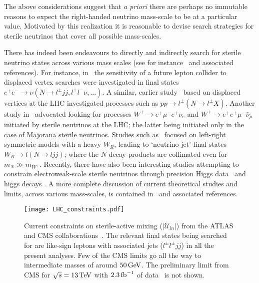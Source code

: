 \documentclass[reprint,doublecolumn,secnumarabic,amssymb, amsmath, aps,nofootinbib,superscriptaddress]{revtex4-1}
\begin{document}
The above considerations suggest that \textit{a priori} there are perhaps no immutable reasons to expect the right-handed neutrino mass-scale to be at a particular value. Motivated by this realization it is reasonable to devise search strategies for sterile neutrinos that cover all possible mass-scales. 

There has indeed been endeavours to directly and indirectly search for sterile neutrino states across various mass scales (see for instance~\cite{Keung:1983uu, Pilaftsis:1991ug, Datta:1993nm, delAguila:2006bda,Atre:2009rg, Deppisch:2015qwa,Dev:2016gvv, Antusch:2016ejd,Lindner:2016lxq,Campos:2017odj,Abada:2012mc, Abada:2013aba,Abada:2014kba} and associated references). For instance, in~\cite{Antusch:2016vyf} the sensitivity of a future lepton collider to displaced vertex searches were investigated in final states $e^+ e^- \rightarrow \nu (N \rightarrow l^\pm jj, l^+ l^- \nu,\ldots)$. A similar, earlier study~\cite{Helo:2013esa} based on displaced vertices at the LHC investigated processes such as $pp\rightarrow l^\pm (N \rightarrow l^\pm X)$. Another study in~\cite{Dib:2015oka} advocated looking for processes $W^+ \rightarrow e^+ \mu^- e^+ \nu_e$ and $W^+ \rightarrow e^+ e^+ \mu^- \bar{\nu}_\mu$ initiated by sterile neutrinos at the LHC; the latter being initiated only in the case of Majorana sterile neutrinos. Studies such as~\cite{Mitra:2016kov} focused on left-right symmetric models with a heavy $W_R$, leading to `neutrino-jet' final states $W_R\rightarrow l (N\rightarrow l jj)$; where the $N$ decay-products are collimated even for $m_N\gg m_{W^\pm}$. Recently, there have also been interesting studies attempting to constrain electroweak-scale sterile neutrinos through precision Higgs data~\cite{Das:2017zjc} and higgs decays \cite{Das:2017rsu}. A more complete discussion of current theoretical studies and limits, across various mass-scales, is contained in~\cite{delAguila:2006bda,Atre:2009rg, Deppisch:2015qwa,Dev:2016gvv, Antusch:2016ejd} and associated references. 

\begin{figure}
  \centering
   \texttt{[image: LHC\_constraints.pdf]}
  \caption{Current constraints on sterile-active mixing ($|\mathcal{U}_{ln}|$) from the ATLAS and CMS collaborations~\cite{Khachatryan:2015gha, Aad:2015xaa, Khachatryan:2016olu}. The relevant final states being searched for are like-sign leptons with associated jets ($l^\pm l^\pm jj$) in all the present analyses. Few of the CMS limits go all the way to intermediate masses of around $50\,\rm{GeV}$. The preliminary limit from CMS for $\sqrt{s}=13\,\rm{TeV}$ with $2.3\,\rm{fb}^{-1}$ of data~\cite{Sirunyan:2017xnz} is not shown.}
  \label{fig:hadroncolliderlim}
\end{figure}
\end{document}
